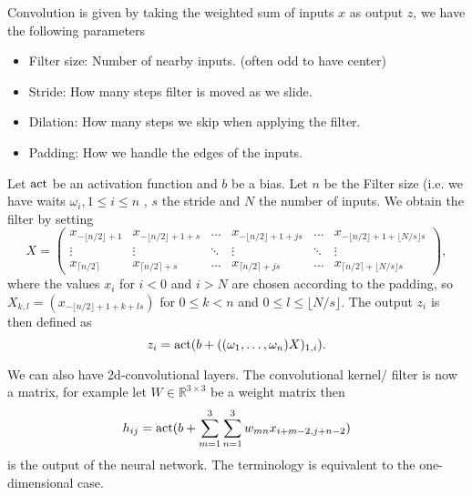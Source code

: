 \documentclass[12 pt]{article}        	%
\begin{document}
\begin{defi}
    Convolution is given by taking the weighted sum of inputs $ x $ as output $ z $, we have the following parameters
    \begin{itemize}
        \item 
        Filter size: Number of nearby inputs. (often odd to have center)

        \item 
        Stride: How many steps filter is moved as we slide.

        \item 
        Dilation: How many steps we skip when applying the filter.

        \item 
        Padding: How we handle the edges of the inputs.
    \end{itemize}
    Let $ \operatorname{act} $ be an activation function and $ b $ be a bias.
    Let $ n $ be the Filter size (i.e. we have waits $ \omega_i , 1 \leq  i \leq n $ , $ s $ the stride and $ N $ the number of inputs.
    We obtain the filter by setting 
    \[
    X
    =
    \begin{pmatrix}
        x_{ - \lfloor n/2 \rfloor + 1 } 
        &
        x_{ - \lfloor n/2 \rfloor + 1 + s } 
        &
        \dots
        &
        x_{ - \lfloor n/2 \rfloor + 1 + j s } 
        &
        \dots 
        &
        x_{ - \lfloor n/2 \rfloor + 1  + \lfloor N / s \rfloor s} 
        \\
        \vdots
        &
        \vdots 
        &
        \ddots
        &
        \vdots
        &
        \ddots
        &
        \vdots 
        \\
        x_{ \lceil n/2 \rceil } 
        &
        x_{ \lceil n/2 \rceil + s } 
        &
        \dots
        &
        x_{ \lceil n/2 \rceil + j s } 
        &
        \dots
        &
        x_{ \lceil n/2 \rceil + \lfloor N / s \rfloor s } 
    \end{pmatrix},
    \]
    where the values $ x_i $ for $ i < 0 $ and $ i > N $ are chosen according to the padding, so $ X_{ k , l } = ( x_{ - \lfloor n/2 \rfloor + 1 + k  + l s }  ) $ for $  0 \leq k < n $ and $ 0 \leq l \leq \lfloor N / s \rfloor $.
    The output $ z_i $ is then defined as
    \[
        z_i = \operatorname{act} ( b + ( ( \omega_1 , \dotsc , \omega_n ) X )_{ 1 , i } ).
    \]
\end{defi}

We can also have 2d-convolutional layers.
The convolutional kernel/ filter is now a matrix, for example let $ W \in \mathbb{ R } ^{ 3 \times 3 } $ be a weight matrix then 
\[
    h_{ i j } = \operatorname{act} ( b + \sum_{ m = 1 }^3 \sum_{ n = 1 }^3 w_{ m n } x_{ i + m - 2 , j + n - 2 } )
\]
is the output of the neural network.
The terminology is equivalent to the one-dimensional case.
\end{document}
